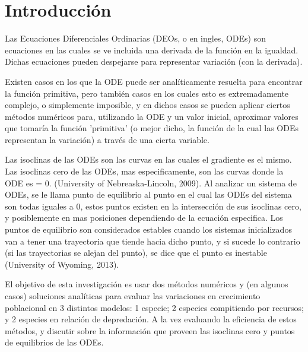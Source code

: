 \documentclass{article}
\begin{document}
\vspace{5\baselineskip}



\section*{Introducción}

\noindent 

 
 \noindent 
Las Ecuaciones Diferenciales Ordinarias (DEOs, o en ingles, ODEs) son ecuaciones en las cuales se ve incluida una derivada de la función en la igualdad. Dichas ecuaciones pueden despejarse para representar variación (con la derivada). \vspace{\baselineskip}

\noindent Existen casos en los que la ODE puede ser analíticamente resuelta para encontrar la función primitiva, pero también casos en los cuales esto es extremadamente complejo, o simplemente imposible, y en dichos casos se pueden aplicar ciertos métodos numéricos para, utilizando la ODE y un valor inicial, aproximar valores que tomaría la función 'primitiva' (o mejor dicho, la función de la cual las ODEs representan la variación) a través de una cierta variable. \vspace{\baselineskip}


\noindent Las isoclinas de las ODEs son las curvas en las cuales el gradiente es el mismo. Las isoclinas cero de las ODEs, mas especificamente, son las curvas donde la ODE es = 0. (University of Nebreaska-Lincoln, 2009). Al analizar un sistema de ODEs, se le llama punto de equilibrio al punto en el cual las ODEs del sistema son todas iguales a 0, estos puntos existen en la intersección de sus isoclinas cero, y posiblemente en mas posiciones dependiendo de la ecuación especifica. Los puntos de equilibrio son considerados estables cuando los sistemas inicializados van a tener una trayectoria que tiende hacia dicho punto, y si sucede lo contrario (si las trayectorias se alejan del punto), se dice que el punto es inestable (University of Wyoming, 2013). \vspace{\baselineskip}

\noindent El objetivo de esta investigación es usar dos métodos numéricos y (en algunos casos) soluciones analíticas para evaluar las variaciones en crecimiento poblacional en 3 distintos modelos: 1 especie; 2 especies compitiendo por recursos; y 2 especies en relación de depredación. A la vez evaluando la eficiencia de estos métodos, y discutir sobre la información que proveen las isoclinas cero y puntos de equilibrios de las ODEs.
\end{document}
